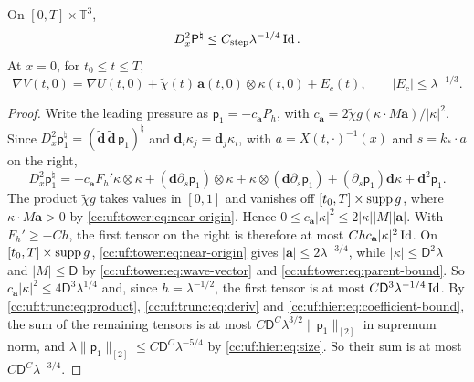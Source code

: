 \begin{lemma}\label{cc:uf:step:lem:pressure-center}
On \([0,T]\times\mathbb T^3\),
\begin{equation}\label{cc:uf:step:eq:hessian}
 D_x^2\mathsf P^\natural\le C_{\rm step}\lambda^{-1/4}\operatorname{Id} .
\end{equation}
At \(x=0\), for \(t_0\le t\le T\),
\begin{equation}\label{cc:uf:tower:eq:central-return}
 \nabla V(t,0)=\nabla U(t,0)
   +\widetilde\chi(t)\,\mathbf a(t,0)\otimes\kappa(t,0)+E_c(t),
 \qquad
 |E_c|\le\lambda^{-1/3} .
\end{equation}
\end{lemma}
\begin{proof}
Write the leading pressure as \(\mathsf p_1=-c_{\mathbf a}P_h\), with
\(c_{\mathbf a}=2\widetilde\chi g(\kappa\cdot M\mathbf a)/|\kappa|^2\). Since
$D_x^2\mathsf p_1^\natural
=(\widetilde{\mathbf d}\,\widetilde{\mathbf d}\,\mathsf p_1)^\natural$ and
\(\mathbf d_i\kappa_j=\mathbf d_j\kappa_i\), with \(a=X(t,\cdot)^{-1}(x)\)
and \(s=k_*\cdot a\) on the right,
\begin{equation}\label{cc:uf:exact:eq:primary-hess}
 D_x^2\mathsf p_1^\natural=
 -c_{\mathbf a}F_h'\kappa\otimes\kappa
 +(\mathbf d\partial_s\mathsf p_1)\otimes\kappa+
 \kappa\otimes(\mathbf d\partial_s\mathsf p_1)
 +(\partial_s\mathsf p_1)\mathbf d\kappa+\mathbf d^2\mathsf p_1 .
\end{equation}
The product $\widetilde\chi g$ takes values in $[0,1]$ and vanishes off
$[t_0,T]\times\operatorname{supp} g$, where $\kappa\cdot M\mathbf a>0$ by
\eqref{cc:uf:tower:eq:near-origin}. Hence
\(0\le c_{\mathbf a}|\kappa|^2\le2|\kappa||M||\mathbf a|\). With
\(F_h'\ge-Ch\), the first tensor on the right is therefore at most
\(Chc_{\mathbf a}|\kappa|^2\operatorname{Id}\). On $[t_0,T]\times\operatorname{supp} g$,
\eqref{cc:uf:tower:eq:near-origin} gives
$|\mathbf a|\le2\lambda^{-3/4}$, while $|\kappa|\le\mathsf D^2\lambda$
and $|M|\le\mathsf D$ by \eqref{cc:uf:tower:eq:wave-vector} and
\eqref{cc:uf:tower:eq:parent-bound}. So
\(c_{\mathbf a}|\kappa|^2\le4\mathsf D^3\lambda^{1/4}\) and, since
$h=\lambda^{-1/2}$, the first tensor is at most
\(C\mathsf D^3\lambda^{-1/4}\operatorname{Id}\). By
\eqref{cc:uf:trunc:eq:product}, \eqref{cc:uf:trunc:eq:deriv} and
\eqref{cc:uf:hier:eq:coefficient-bound}, the sum of the remaining
tensors is at most
$C\mathsf D^C\lambda^{3/2}\|\mathsf p_1\|_{[2]}$ in supremum norm, and
\(\lambda\|\mathsf p_1\|_{[2]}\le C\mathsf D^C\lambda^{-5/4}\)
by \eqref{cc:uf:hier:eq:size}. So their sum is at most
$C\mathsf D^C\lambda^{-3/4}$.


\end{proof}
